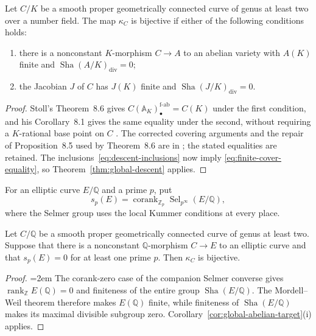\begin{corollary}\label{cor:global-abelian-target}
Let $C/K$ be a smooth proper geometrically connected curve of genus at
least two over a number field. The map $\kappa_C$ is bijective if either
of the following conditions holds:
\begin{enumerate}[label=\textnormal{(\roman*)}]
\item there is a nonconstant $K$-morphism $C\to A$ to an abelian
variety with $A(K)$ finite and $\operatorname{Sha}(A/K)_{\mathrm{div}}=0$;
\item the Jacobian $J$ of $C$ has $J(K)$ finite and
$\operatorname{Sha}(J/K)_{\mathrm{div}}=0$.
\end{enumerate}
\end{corollary}

\begin{proof}
Stoll's Theorem~8.6 gives
$C(\mathbb A_K)_\bullet^{\mathrm{f\text{-}ab}}=C(K)$ under the first
condition, and his Corollary~8.1 gives the same equality under the
second, without requiring a $K$-rational base point on $C$
\cite{StollFiniteDescent}. The corrected covering arguments and the
repair of Proposition~8.5 used by Theorem~8.6 are in
\cite[Sections~2--3]{StollFiniteDescentErrata}; the stated equalities
are retained. The inclusions~\eqref{eq:descent-inclusions} now imply
\eqref{eq:finite-cover-equality}, so Theorem~\ref{thm:global-descent}
applies.
\end{proof}

For an elliptic curve $E/\mathbb Q$ and a prime $p$, put
\[
 s_p(E)=\operatorname{corank}_{\mathbb Z_p}
        \operatorname{Sel}_{p^\infty}(E/\mathbb Q),
\]
where the Selmer group uses the local Kummer conditions at every place.

\begin{corollary}\label{cor:global-selmer-target}
Let $C/\mathbb Q$ be a smooth proper geometrically connected curve of
genus at least two. Suppose that there is a nonconstant
$\mathbb Q$-morphism $C\to E$ to an elliptic curve and that $s_p(E)=0$
for at least one prime $p$. Then $\kappa_C$ is bijective.
\end{corollary}

\begin{proof}
\emergencystretch=2em
The corank-zero case of the companion Selmer converse
\cite[Theorem~1.1]{OpenAISelmerConverse2026} gives
$\operatorname{rank}_{\mathbb Z}E(\mathbb Q)=0$ and finiteness of the
entire group $\operatorname{Sha}(E/\mathbb Q)$. The Mordell--Weil
theorem therefore makes $E(\mathbb Q)$ finite, while finiteness of
$\operatorname{Sha}(E/\mathbb Q)$ makes its maximal divisible subgroup
zero. Corollary~\ref{cor:global-abelian-target}(i) applies.
\end{proof}

